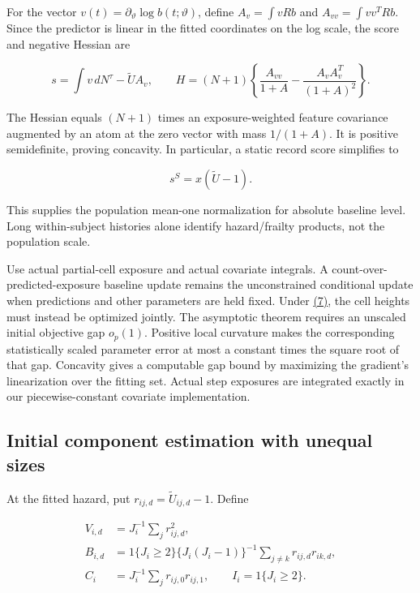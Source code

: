 \documentclass[11pt]{article}
\begin{document}
For the vector \(v(t)=\partial_\vartheta\log b(t;\vartheta)\), define
\(A_v=\int vRb\) and \(A_{vv}=\int vv^TRb\). Since the predictor is linear in the fitted coordinates on the log scale, the score and negative Hessian are

\begin{equation*}
s=\int v\,dN^\tau-\widetilde U A_v,\qquad
H=(N+1)\left\{\frac{A_{vv}}{1+A}-\frac{A_vA_v^T}{(1+A)^2}\right\}.
\tag{10}\label{eq:10}
\end{equation*}

The Hessian equals \((N+1)\) times an exposure-weighted feature covariance augmented by an atom at the zero vector with mass \(1/(1+A)\). It is positive semidefinite, proving concavity. In particular, a static record score simplifies to

\begin{equation*}
s^S=x(\widetilde U-1).\tag{11}\label{eq:11}
\end{equation*}

This supplies the population mean-one normalization for absolute baseline level. Long within-subject histories alone identify hazard/frailty products, not the population scale.

Use actual partial-cell exposure and actual covariate integrals. A count-over-predicted-exposure baseline update remains the unconstrained conditional update when predictions and other parameters are held fixed. Under \hyperref[eq:7]{(7)}, the cell heights must instead be optimized jointly. The asymptotic theorem requires an unscaled initial objective gap \(o_p(1)\). Positive local curvature makes the corresponding statistically scaled parameter error at most a constant times the square root of that gap. Concavity gives a computable gap bound by maximizing the gradient's linearization over the fitting set. Actual step exposures are integrated exactly in our piecewise-constant covariate implementation.

\subsection{Initial component estimation with unequal sizes}\label{sec:3.2}

At the fitted hazard, put \(r_{ij,d}=\widetilde U_{ij,d}-1\). Define

\begin{equation*}
\begin{aligned}
V_{i,d}&=J_i^{-1}\sum_j r_{ij,d}^2,\\
B_{i,d}&=1\{J_i\geq2\}\{J_i(J_i-1)\}^{-1}
             \sum_{j\ne k}r_{ij,d}r_{ik,d},\\
C_i&=J_i^{-1}\sum_jr_{ij,0}r_{ij,1},\qquad I_i=1\{J_i\geq2\}.
\end{aligned}\tag{12}\label{eq:12}
\end{equation*}
\end{document}
